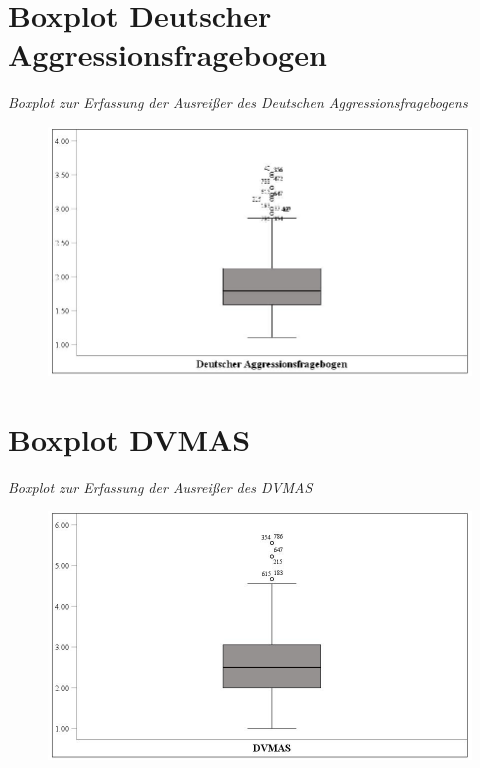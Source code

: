 \begin{appendices}
    \chapter{Boxplot Deutscher Aggressionsfragebogen}            \label{Boxplot_AggroFB}
    \noindent \textit{Boxplot zur Erfassung der Ausreißer des Deutschen Aggressionsfragebogens}

    \begin{figure}[htb!]
        \centering
            \includegraphics[width=\textwidth]{Boxplot AggroFB.jpg}

    \end{figure}
    
    


    \chapter{Boxplot DVMAS}            \label{Boxplot_DVMAS}
    \noindent \textit{Boxplot zur Erfassung der Ausreißer des DVMAS}

    \begin{figure}[htb!]
        \centering
            \includegraphics[width=\textwidth]{Boxplot DVMAS.jpg}


\end{figure}
\end{appendices}
